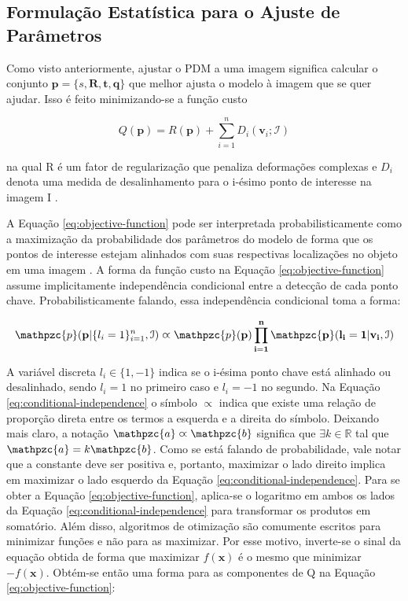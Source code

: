 {\begin{itemize}
\end{itemize}

\subsection{Formulação Estatística para o Ajuste de Parâmetros}
\label{ssec:tracking-parameter-fitting}

Como visto anteriormente, ajustar o PDM a uma imagem significa calcular o
conjunto $\mathbf{p} = \{s, \bm{R}, \bm{t}, \bm{q}\}$ que melhor ajusta o modelo
à imagem que se quer ajudar. Isso é feito minimizando-se a função custo

\begin{equation}
Q(\mathbf{p}) = R(\mathbf{p}) + \sum_{i=1}^n D_i(\mathbf{v}_i; \mathcal{I})
\label{eq:objective-function}
\end{equation}

na qual R é um fator de regularização que penaliza deformações complexas e $D_i$
denota uma medida de desalinhamento para o i-ésimo ponto de interesse na imagem
I \cite{facetracker}.

A Equação \ref{eq:objective-function} pode ser interpretada probabilisticamente
como a maximização da probabilidade dos parâmetros do modelo de forma que os
pontos de interesse estejam alinhados com suas respectivas localizações no
objeto em uma imagem \cite{facetracker}. A forma da função custo na Equação
\ref{eq:objective-function} assume implicitamente independência condicional
entre a detecção de cada ponto chave. Probabilisticamente falando, essa
independência condicional toma a forma:

\begin{equation}
\label{eq:conditional-independence}
\mathpzc{p}(\mathbf{p} | \{l_i = 1\}_{i=1}^n, \mathcal{I}) \varpropto \mathpzc{p}(\bf{p}) \prod_{i=1}^n \mathpzc{p}(l_i = 1 | \mathbf{v}_i, \mathcal{I})
\end{equation}

A variável discreta $l_i \in \{1, -1\}$ indica se o i-ésima ponto chave está
alinhado ou desalinhado, sendo $l_i=1$ no primeiro caso e $l_i=-1$ no segundo.
Na Equação \ref{eq:conditional-independence} o símbolo $\varpropto$ indica que
existe uma relação de proporção direta entre os termos a esquerda e a direita do
símbolo. Deixando mais claro, a notação $\mathpzc{a} \varpropto \mathpzc{b}$
significa que $\exists k \in \mathbb{R}$ tal que $\mathpzc{a} = k \mathpzc{b}$.
Como se está falando de probabilidade, vale notar que a constante deve ser
positiva e, portanto, maximizar o lado direito implica em maximizar o lado
esquerdo da Equação \ref{eq:conditional-independence}.  Para se obter a Equação
\ref{eq:objective-function}, aplica-se o logaritmo em ambos os lados da Equação
\ref{eq:conditional-independence} para transformar os produtos em somatório.
Além disso, algoritmos de otimização são comumente escritos para minimizar
funções e não para as maximizar. Por esse motivo, inverte-se o sinal da equação
obtida de forma que maximizar $f(\mathbf{x})$ é o mesmo que minimizar
$-f(\mathbf{x})$. Obtém-se então uma forma para as componentes de Q na Equação
\ref{eq:objective-function}:

}
